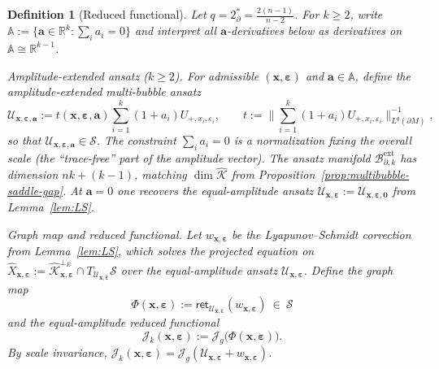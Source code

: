 \documentclass[11pt,reqno,a4paper]{amsart}
\numberwithin{equation}{section}
\theoremstyle{plain}
\newtheorem{definition}[theorem]{Definition}
\theoremstyle{remark}
\theoremstyle{plain}
\begin{document}
\begin{definition}[Reduced functional]\label{def:reduced}
Let $q=2^*_{\partial}=\frac{2(n-1)}{n-2}$.
For $k\ge2$, write
$\mathbb A:=\{\mathbf a\in\mathbb R^k:\sum_i a_i=0\}$
and interpret all $\mathbf a$-derivatives below as derivatives on
$\mathbb A\cong\mathbb R^{k-1}$.

\emph{Amplitude-extended ansatz ($k\ge2$).}
For admissible $(\mathbf x,\boldsymbol\varepsilon)$ and
$\mathbf a\in\mathbb A$,
define the \emph{amplitude-extended multi-bubble ansatz}
\[
\mathcal U_{\mathbf x,\boldsymbol\varepsilon,\mathbf a}
:= t(\mathbf x,\boldsymbol\varepsilon,\mathbf a)\sum_{i=1}^k (1+a_i)U_{+,x_i,\varepsilon_i},
\qquad
t:=\Big\|\sum_{i=1}^k (1+a_i)U_{+,x_i,\varepsilon_i}\Big\|_{L^q(\partial M)}^{-1},
\]
so that $\mathcal U_{\mathbf x,\boldsymbol\varepsilon,\mathbf a}\in\mathcal S$.
The constraint $\sum_i a_i=0$ is a normalization fixing the overall scale
(the ``trace-free'' part of the amplitude vector).
The ansatz manifold $\mathcal B_{\partial,k}^{\mathrm{ext}}$ has dimension $nk+(k-1)$,
matching $\dim\widehat{\mathcal K}$ from Proposition~\ref{prop:multibubble-saddle-gap}.
At $\mathbf a=0$ one recovers the \emph{equal-amplitude} ansatz
$\mathcal U_{\mathbf x,\boldsymbol\varepsilon}:=\mathcal U_{\mathbf x,\boldsymbol\varepsilon,\mathbf 0}$
from Lemma~\ref{lem:LS}.

\emph{Graph map and reduced functional.}
Let $w_{\mathbf x,\boldsymbol\varepsilon}$ be the Lyapunov--Schmidt correction from
Lemma~\ref{lem:LS}, which solves the projected equation on
$\widehat X_{\mathbf x,\boldsymbol\varepsilon}
:=\widehat{\mathcal K}_{\mathbf x,\boldsymbol\varepsilon}^{\perp_E}
\cap T_{\mathcal U_{\mathbf x,\boldsymbol\varepsilon}}\mathcal S$
over the equal-amplitude ansatz $\mathcal U_{\mathbf x,\boldsymbol\varepsilon}$.
Define the graph map
\[
\Phi(\mathbf x,\boldsymbol\varepsilon)
:=\mathsf{ret}_{\mathcal U_{\mathbf x,\boldsymbol\varepsilon}}
(w_{\mathbf x,\boldsymbol\varepsilon})\ \in\ \mathcal S
\]
and the \emph{equal-amplitude reduced functional}
\begin{equation}\label{eq:Jk}
\mathcal J_k(\mathbf x,\boldsymbol\varepsilon)
:= \mathcal J_g\big(\Phi(\mathbf x,\boldsymbol\varepsilon)\big).
\end{equation}
By scale invariance,
$\mathcal J_k(\mathbf x,\boldsymbol\varepsilon)
=\mathcal J_g(\mathcal U_{\mathbf x,\boldsymbol\varepsilon}+w_{\mathbf x,\boldsymbol\varepsilon})$.


\end{definition}
\end{document}
